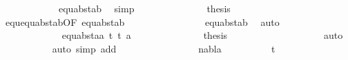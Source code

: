\begin{isabellebody}
\ \ \ \ \ \ \ \ \ \ \ \ equ{\isacharunderscore}{\kern0pt}abst{\isacharunderscore}{\kern0pt}ab{\isacharparenleft}{\kern0pt}{}{\isacharcomma}{\kern0pt}{}{\isacharcomma}{\kern0pt}{}{\isacharparenright}{\kern0pt}\ \isamarkupfalse%
\ simp\isanewline
\ \ \ \ \ \ \ \ \ \ \ \isamarkupfalse%
\ \isamarkupfalse%
\ {\isacharquery}{\kern0pt}thesis\isanewline
\ \ \ \ \ \ \ \ \ \ \ \ \ \isamarkupfalse%
\ equ{\isachardot}{\kern0pt}equ{\isacharunderscore}{\kern0pt}abst{\isacharunderscore}{\kern0pt}ab{\isacharbrackleft}{\kern0pt}OF\ equ{\isacharunderscore}{\kern0pt}abst{\isacharunderscore}{\kern0pt}ab{\isacharparenleft}{\kern0pt}{}{\isacharparenright}{\kern0pt}{\isacharbrackright}{\kern0pt}\isanewline
\ \ \ \ \ \ \ \ \ \ \ \ \ \ \ {}{\isacharparenleft}{\kern0pt}{}{\isacharcomma}{\kern0pt}{}{\isacharcomma}{\kern0pt}{}{\isacharparenright}{\kern0pt}\ equ{\isacharunderscore}{\kern0pt}abst{\isacharunderscore}{\kern0pt}ab{\isacharparenleft}{\kern0pt}{}{\isacharcomma}{\kern0pt}{}{\isacharcomma}{\kern0pt}{}{\isacharparenright}{\kern0pt}\ \isamarkupfalse%
\ auto\isanewline
\ \ \ \ \ \ \ \ \ \isamarkupfalse%
\isanewline
\ \ \ \ \ \ \ \ \ \ \ \isamarkupfalse%
\ {\isacharparenleft}{\kern0pt}equ{\isacharunderscore}{\kern0pt}abst{\isacharunderscore}{\kern0pt}aa\ t{}{\isacharprime}{\kern0pt}\ t{}{\isacharprime}{\kern0pt}\ a{\isacharparenright}{\kern0pt}\isanewline
\ \ \ \ \ \ \ \ \ \ \ \isamarkupfalse%
\ \isamarkupfalse%
\ {\isacharquery}{\kern0pt}thesis\ \isanewline
\ \ \ \ \ \ \ \ \ \ \ \ \ \isamarkupfalse%
\ {}\ {}{\isacharparenleft}{\kern0pt}{}{\isacharcomma}{\kern0pt}{}{\isacharcomma}{\kern0pt}{}{\isacharcomma}{\kern0pt}{}{\isacharparenright}{\kern0pt}\ \isamarkupfalse%
\ auto\isanewline
\ \ \ \ \ \ \ \ \ \isamarkupfalse%
\ {\isacharparenleft}{\kern0pt}auto\ simp\ add{\isacharcolon}{\kern0pt}\ {}{\isacharparenright}{\kern0pt}\isanewline
\ \ \ \ \ \isamarkupfalse%
\isanewline
\ \ \ \ \ \ \ \isamarkupfalse%
\ {\isacharparenleft}{\kern0pt}{}\ nabla{\isacharparenright}{\kern0pt}\isanewline
\ \ \ \ \ \ \ \ \isamarkupfalse%
\ t{}{}\ \isamarkupfalse%

\end{isabellebody}

